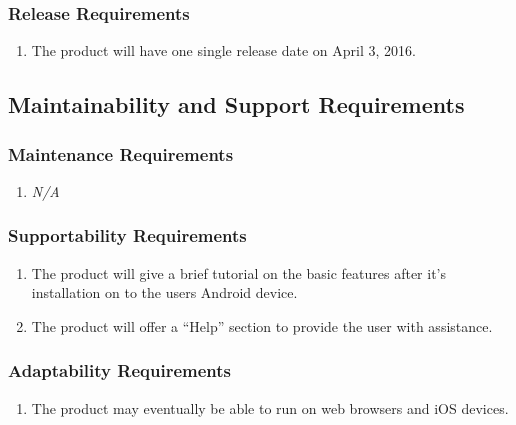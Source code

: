 \documentclass[]{article}
\begin{document}
\subsubsection{Release Requirements}
\label{ssub:release_requirements}
\begin{enumerate}[{OE}1. ]
	\item The product will have one single release date on April 3, 2016.
\end{enumerate}


\subsection{Maintainability and Support Requirements}
\label{sub:maintainability_and_support_requirements}

\subsubsection{Maintenance Requirements}
\label{ssub:maintenance_requirements}
\begin{enumerate}[{MS}1. ]
	\item \emph{N/A}
\end{enumerate}

\subsubsection{Supportability Requirements}
\label{ssub:supportability_requirements}
\begin{enumerate}[{MS}1. ]
	\item The product will give a brief tutorial on the basic features after it's installation on to the users Android 
	device.
	\item The product will offer a ``Help'' section to provide the user with assistance.
\end{enumerate}

\subsubsection{Adaptability Requirements}
\label{ssub:adaptability_requirements}
\begin{enumerate}[{MS}1. ]
	\item The product may eventually be able to run on web browsers and iOS devices.
\end{enumerate}
\end{document}
